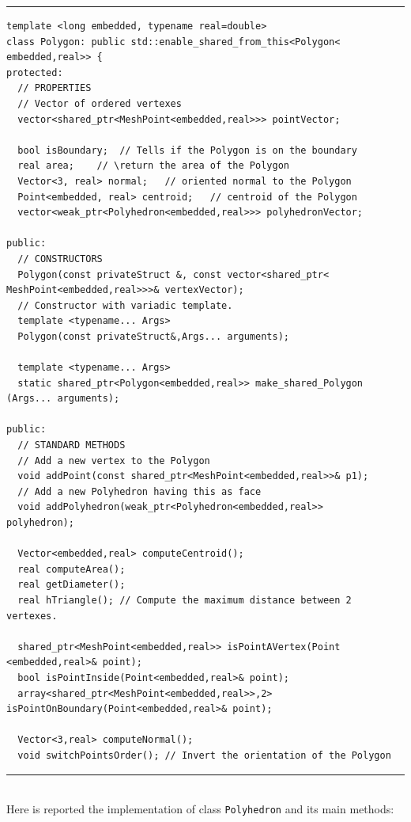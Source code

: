 \noindent\rule{12.7cm}{1pt}
\begin{lstlisting}[caption=File \texttt{Polygon.h}]
template <long embedded, typename real=double>
class Polygon: public std::enable_shared_from_this<Polygon<
embedded,real>> {
protected:
  // PROPERTIES
  // Vector of ordered vertexes
  vector<shared_ptr<MeshPoint<embedded,real>>> pointVector;
	
  bool isBoundary;	// Tells if the Polygon is on the boundary
  real area;	// \return the area of the Polygon
  Vector<3, real> normal;	// oriented normal to the Polygon
  Point<embedded, real> centroid;	// centroid of the Polygon
  vector<weak_ptr<Polyhedron<embedded,real>>> polyhedronVector;

public:
  // CONSTRUCTORS
  Polygon(const privateStruct &, const vector<shared_ptr<
MeshPoint<embedded,real>>>& vertexVector);
  // Constructor with variadic template.
  template <typename... Args>
  Polygon(const privateStruct&,Args... arguments);

  template <typename... Args>
  static shared_ptr<Polygon<embedded,real>> make_shared_Polygon
(Args... arguments);

public:
  // STANDARD METHODS
  // Add a new vertex to the Polygon
  void addPoint(const shared_ptr<MeshPoint<embedded,real>>& p1); 
  // Add a new Polyhedron having this as face
  void addPolyhedron(weak_ptr<Polyhedron<embedded,real>> 
polyhedron);	
			
  Vector<embedded,real> computeCentroid();
  real computeArea();
  real getDiameter();
  real hTriangle(); // Compute the maximum distance between 2 vertexes.

  shared_ptr<MeshPoint<embedded,real>> isPointAVertex(Point
<embedded,real>& point);	
  bool isPointInside(Point<embedded,real>& point);
  array<shared_ptr<MeshPoint<embedded,real>>,2> 
isPointOnBoundary(Point<embedded,real>& point);

  Vector<3,real> computeNormal();
  void switchPointsOrder(); // Invert the orientation of the Polygon
\end{lstlisting}

\noindent\rule{12.7cm}{1pt}\\

Here is reported the implementation of class \verb|Polyhedron| and its main methods:

